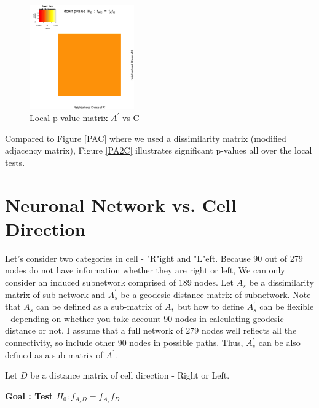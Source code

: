 \documentclass[12pt]{report}
\begin{document}
\begin{figure}[H]
\captionsetup{format=plain}
\centering
\includegraphics[width=0.4\textwidth]{../figure/P_A2_C.png}
\caption{Local p-value matrix $A^\prime$ vs C}
\label{fig:PA2C}
\end{figure} 

Compared to Figure \ref{PAC} where we used a dissimilarity matrix (modified adjacency matrix), Figure \ref{PA2C} illustrates significant p-values all over the local tests. 



\newpage
\section{Neuronal Network vs. Cell Direction}

Let's consider two categories in cell - "R"ight and "L"eft. Because 90 out of 279 nodes do not have information whether they are right or left, We can only consider an induced subnetwork comprised of 189 nodes. Let $A_{s}$ be a dissimilarity matrix of sub-network and $A^\prime_{s}$ be a geodesic distance matrix of subnetwork. Note that $A_{s}$ can be defined as a sub-matrix of $A,$ but how to define $A^\prime_{s}$ can be flexible - depending on whether you take account 90 nodes in calculating geodesic distance or not. I assume that a full network of 279 nodes well reflects all the connectivity, so include other 90 nodes in possible paths. Thus, $A^\prime_{s}$ can be also defined as a sub-matrix of $A^\prime.$
  
Let $D$ be a distance matrix of cell direction - Right or Left. 

\begin{center}\textbf{Goal : Test $H_{0} : f_{A_{s}D} = f_{A_{s}}f_{D}$}
\end{center}  
\end{document}
